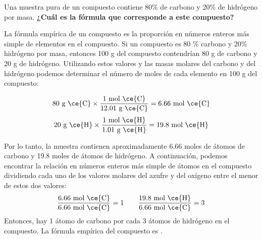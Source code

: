 Una muestra pura de un compuesto contiene 80\% de carbono y 20\% de hidrógeno por masa.
\textbf{¿Cuál es la fórmula que corresponde a este compuesto?}

\begin{oneparchoices}
    \CorrectChoice {}
    \choice {}
    \choice {}
    \choice {}
\end{oneparchoices}

\begin{solutionbox}{8cm}
    La fórmula empírica de un compuesto es la proporción en números enteros más simple de elementos en el compuesto.
    Si un compuesto es 80 \% carbono y 20\% hidrógeno por masa, entonces 100 g del compuesto contendrían 80 g de carbono y 20 g de hidrógeno. Utilizando estos valores y las masas molares del carbono y del hidrógeno podemos determinar el número de moles de cada elemento en 100 g del compuesto:

    \[80 \text{ g \ce{C}} \times \frac{1 \text{ mol \ce{C}}}{12.01 \text{ g \ce{C}}} = 6.66 \text{ mol \ce{C}} \]
    \[20 \text{ g \ce{H}} \times \frac{1 \text{ mol \ce{H}}}{1.01 \text{ g \ce{H}}} = 19.8 \text{ mol \ce{H}} \]

    Por lo tanto, la muestra contienen aproximadamente 6.66 moles de átomos de carbono y 19.8 moles de átomos de hidrógeno.
    A continuación, podemos encontrar la relación en números enteros más simple de átomos en el compuesto dividiendo cada uno de los valores molares del azufre y del oxígeno entre el menor de estos dos valores:
    \[ \frac{6.66 \text{ mol \ce{C}}}{6.66 \text{ mol \ce{C}}} = 1 \qquad \frac{19.8 \text{ mol \ce{H}}}{6.66 \text{ mol \ce{C}}} = 3 \]
    Entonces, hay 1 átomo de carbono por cada 3 átomos de hidrógeno en el compuesto.
    La fórmula empírica del compuesto es .
\end{solutionbox}